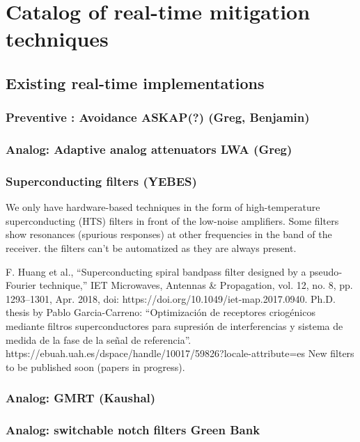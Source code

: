 \section{Catalog of real-time mitigation techniques}
\label{section:hardware:catalog}

\subsection{Existing real-time implementations}
\label{subsection:hardware:catalog:existing}
\subsubsection{Preventive : Avoidance ASKAP(?) (Greg, Benjamin)}

\subsubsection{Analog: Adaptive analog attenuators LWA (Greg)}

\subsubsection{Superconducting filters (YEBES)}
We only have hardware-based techniques in the form of high-temperature superconducting (HTS) filters in front of the low-noise amplifiers.
Some filters show resonances (spurious responses) at other frequencies in the band of the receiver.
the filters can’t be automatized as they are always present.

F. Huang et al., “Superconducting spiral bandpass filter designed by a pseudo‐Fourier technique,” IET Microwaves, Antennas \& Propagation, vol. 12, no. 8, pp. 1293–1301, Apr. 2018, doi: https://doi.org/10.1049/iet-map.2017.0940.
Ph.D. thesis by Pablo Garcia-Carreno: “Optimización de receptores criogénicos mediante filtros superconductores para supresión de interferencias y sistema de medida de la fase de la señal de referencia”. https://ebuah.uah.es/dspace/handle/10017/59826?locale-attribute=es
New filters to be published soon (papers in progress).


\subsubsection{Analog: GMRT (Kaushal)}
\subsubsection{Analog: switchable notch filters Green Bank}
